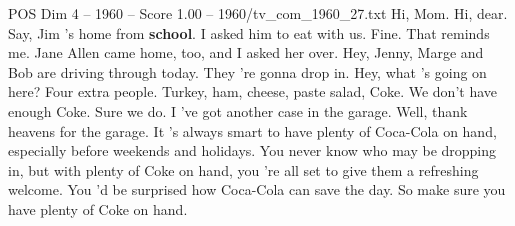 \begin{textsample}{POS Dim 4 – 1960 – Score 1.00 – 1960/tv\_com\_1960\_27.txt}  \label{ex:f4_pos_016}
Hi, Mom.
Hi, dear.
Say, Jim 's home from \textbf{school}.
I asked him to eat with us.
Fine.
That reminds me.
Jane Allen came home, too, and I asked her over.
Hey, Jenny, Marge and Bob are driving through today.
They 're gonna drop in.
Hey, what 's going on here?
Four extra people.
Turkey, ham, cheese, paste salad, Coke.
We don't have enough Coke.
Sure we do.
I 've got another case in the garage.
Well, thank heavens for the garage.
It 's always smart to have plenty of Coca-Cola on hand, especially before weekends and holidays.
You never know who may be dropping in, but with plenty of Coke on hand, you 're all set to give them a refreshing welcome.
You 'd be surprised how Coca-Cola can save the day.
So make sure you have plenty of Coke on hand.

\end{textsample}
